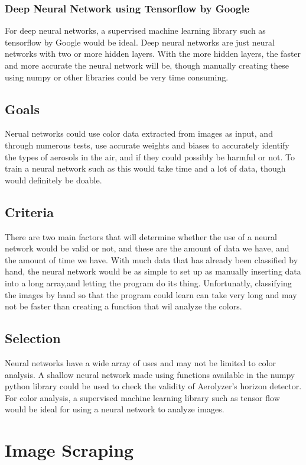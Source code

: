 \documentclass[onecolumn, draftclsnofoot,10pt, compsoc]{IEEEtran}
\begin{document}
\begin{singlespace}
\subsubsection{Deep Neural Network using Tensorflow by Google}
For deep neural networks, a supervised machine learning library such as tensorflow by Google would be ideal. Deep neural networks are just neural networks with two or more hidden layers. With the more hidden layers, the faster and more accurate the neural network will be, though manually creating these using numpy or other libraries could be very time consuming.

\subsection{Goals}
Nerual networks could use color data extracted from images as input, and through numerous tests, use accurate weights and biases to accurately identify the types of aerosols in the air, and if they could possibly be harmful or not. To train a neural network such as this would take time and a lot of data, though would definitely be doable. 


\subsection{Criteria}
There are two main factors that will determine whether the use of a neural network would be valid or not, and these are the amount of data we have, and the amount of time we have. With much data that has already been classified by hand, the neural network would be as simple to set up as manually inserting data into a long array,and letting the program do its thing. Unfortunatly, classifying the images by hand so that the program could learn can take very long and may not be faster than creating a function that wil analyze the colors. 

\subsection{Selection}
Neural networks have a wide array of uses and may not be limited to color analysis. A shallow neural network made using functions available in the numpy python library could be used to check the validity of Aerolyzer's horizon detector. For color analysis, a supervised machine learning library such as tensor flow would be ideal for using a neural network to analyze images. 


\section{Image Scraping}

\end{singlespace}
\end{document}
